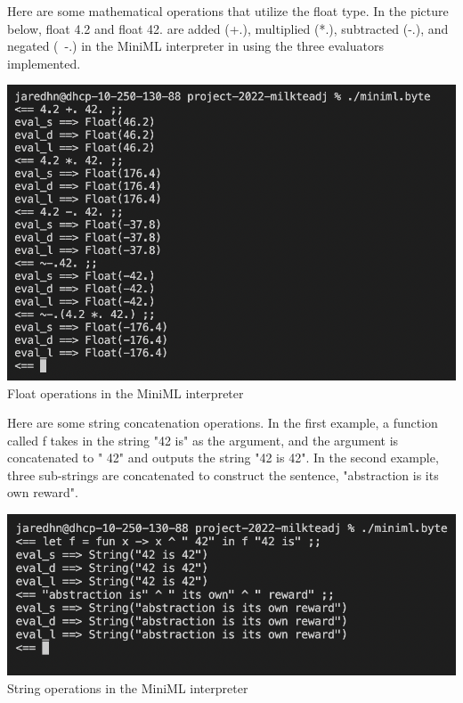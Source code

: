 \documentclass[12pt]{article}
\begin{document}
Here are some mathematical operations that utilize the float type. In the picture below, float 4.2 and float 42. are added (+.), multiplied (*.), subtracted (-.), and negated (~-.) in the MiniML interpreter in using the three evaluators implemented. 
\begin{center}
\includegraphics[width=15cm]{floats.png}\\
Float operations in the MiniML interpreter
\end{center}

Here are some string concatenation operations. In the first example, a function called f takes in the string "42 is" as the argument, and the argument is concatenated to " 42" and outputs the string "42 is 42". In the second example, three sub-strings are concatenated to construct the sentence, "abstraction is its own reward". 
\begin{center}
\includegraphics[width=15cm]{string.png}\\
String operations in the MiniML interpreter
\end{center}
\end{document}
